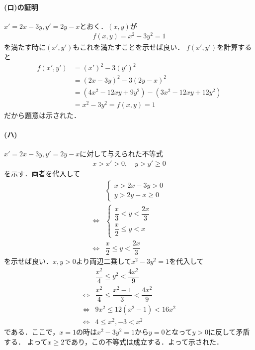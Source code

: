 \documentclass[../../main.tex]{subfiles}
\begin{document}
\paragraph{(ロ)の証明}

$x'=2x-3y, y'=2y-x$とおく．$(x,y)$が
\begin{align}
  f(x,y) = x^2-3y^2 = 1
\end{align}
を満たす時に$(x',y')$もこれを満たすことを示せば良い．
$f(x',y')$を計算すると
\begin{align}
  f(x',y')
  &= (x')^2 - 3(y')^2  \\
  &= (2x-3y)^2 - 3(2y-x) ^2 \\
  &= (4x^2-12xy+9y^2) - (3x^2-12xy+12y^2) \\
  &= x^2 -3y^2 = f(x,y) = 1
\end{align}
だから題意は示された．

\paragraph{(ハ)}

$x'=2x-3y, y'=2y-x$に対して与えられた不等式
\begin{align}
  x > x' > 0, \quad
  y > y' \ge 0
\end{align}
を示す．両者を代入して
\begin{align}
  &
  \begin{cases}
    x > 2x-3y > 0 \\
    y > 2y-x \ge 0
  \end{cases} \\
  \iff
  &
  \begin{cases}
    \dfrac{x}{3} < y < \dfrac{2x}{3} \\
    \dfrac{x}{2} \le y < x
  \end{cases} \\
  \iff
  & \dfrac{x}{2} \le y < \dfrac{2x}{3}
\end{align}
を示せば良い．$x,y>0$より両辺二乗して$x^2-3y^2=1$を代入して
\begin{align}
  &\dfrac{x^2}{4} \le y^2 < \dfrac{4x^2}{9} \\
  \iff
  &\dfrac{x^2}{4} \le \dfrac{x^2-1}{3} < \dfrac{4x^2}{9} \\
  \iff
  & 9x^2 \le 12(x^2-1) < 16x^2 \\
  \iff
  & 4 \le x^2, -3 < x^2
\end{align}
である．ここで，$x=1$の時は$x^2-3y^2=1$から$y=0$となって$y>0$に反して矛盾する．
よって$x \ge 2$であり，この不等式は成立する．よって示された．
\end{document}

